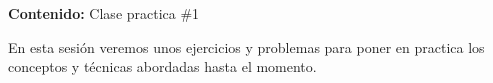 {\Large\textbf{Contenido:} Clase practica \#1}

En esta sesión veremos unos ejercicios y problemas para poner en practica los conceptos y técnicas abordadas hasta el
momento.